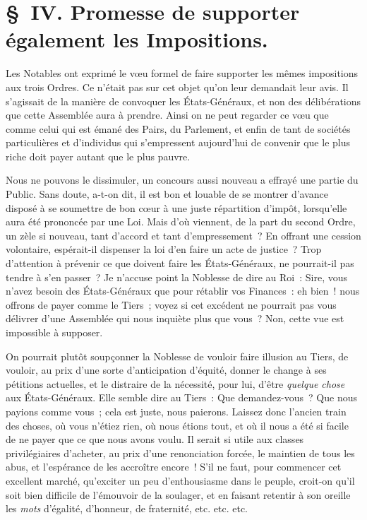 \documentclass[french,twoside]{book} %
\begin{document}
\section[{§ IV. Promesse de supporter également les Impositions.}]{§ IV. Promesse de supporter également les Impositions.}
\noindent Les Notables ont exprimé le vœu formel de faire supporter les mêmes impositions aux trois Ordres. Ce n’était pas sur cet objet qu’on leur demandait leur avis. Il s’agissait de la manière de convoquer les États-Généraux, et non des délibérations que cette Assemblée aura à prendre. Ainsi on ne peut regarder ce vœu que comme celui qui est émané des Pairs, du Parlement, et enfin de tant de sociétés particulières et d’individus qui s’empressent aujourd’hui de convenir que le plus riche doit payer autant que le plus pauvre.\par
Nous ne pouvons le dissimuler, un concours aussi nouveau a effrayé une partie du Public. Sans doute, a-t-on dit, il est bon et louable de se montrer d’avance disposé à se soumettre de bon cœur à une juste répartition d’impôt, lorsqu’elle aura été prononcée par une Loi. Mais d’où viennent, de la part du second Ordre, un zèle si nouveau, tant d’accord et tant d’empressement ? En offrant une cession volontaire, espérait-il dispenser la loi d’en faire un acte de justice ? Trop d’attention à prévenir ce que doivent faire les États-Généraux, ne pourrait-il pas tendre à s’en passer ? Je n’accuse point la Noblesse de dire au Roi : Sire, vous n’avez besoin des États-Généraux que pour rétablir vos Finances : eh bien ! nous offrons de payer comme le Tiers ; voyez si cet excédent ne pourrait pas vous délivrer d’une Assemblée qui nous inquiète plus que vous ? Non, cette vue est impossible à supposer.\par
On pourrait plutôt soupçonner la Noblesse de vouloir faire illusion au Tiers, de vouloir, au prix d’une sorte d’anticipation d’équité, donner le change à ses pétitions actuelles, et le distraire de la nécessité, pour lui, d’être {\itshape quelque chose} aux États-Généraux. Elle semble dire au Tiers : Que demandez-vous ? Que nous payions comme vous ; cela est juste, nous paierons. Laissez donc l’ancien train des choses, où vous n’étiez rien, où nous étions tout, et où il nous a été si facile de ne payer que ce que nous avons voulu. Il serait si utile aux classes privilégiaires d’acheter, au prix d’une renonciation forcée, le maintien de tous les abus, et l’espérance de les accroître encore ! S’il ne faut, pour commencer cet excellent marché, qu’exciter un peu d’enthousiasme dans le peuple, croit-on qu’il soit bien difficile de l’émouvoir de la soulager, et en faisant retentir à son oreille les {\itshape mots} d’égalité, d’honneur, de fraternité, etc. etc. etc.\par
\end{document}
